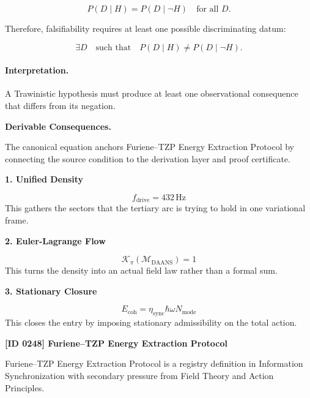 \begin{equation}
P(D\mid H)=P(D\mid \neg H)
\quad
\text{for all }D .
\end{equation}

Therefore, falsifiability requires at least one possible discriminating datum:

\begin{equation}
\boxed{
\exists D
\quad\text{such that}\quad
P(D\mid H)\neq P(D\mid \neg H).
}
\end{equation}

\paragraph{Interpretation.}
A Trawinistic hypothesis must produce at least one observational consequence that differs from its negation.

\par\vspace{0.35em}
\noindent\textbf{Derivable Consequences.}\quad
\begingroup
\footnotesize
\raggedright
The canonical equation anchors Furiene--TZP Energy Extraction Protocol by connecting the source condition to the derivation layer and proof certificate.
\par\endgroup

\noindent\textbf{1. Unified Density}\par
\[
f_{\mathrm{drive}}=432\,\mathrm{Hz}
\]
\noindent This gathers the sectors that the tertiary arc is trying to hold in one variational frame.\par
\noindent\textbf{2. Euler-Lagrange Flow}\par
\[
\mathcal{K}_{\pi}(\mathcal{M}_{\mathrm{DAANS}})=1
\]
\noindent This turns the density into an actual field law rather than a formal sum.\par
\noindent\textbf{3. Stationary Closure}\par
\[
E_{\mathrm{coh}}=\eta_{\mathrm{sync}}\hbar\omega N_{\mathrm{mode}}
\]
\noindent This closes the entry by imposing stationary admissibility on the total action.\par

\clearpage
\noindent\textbf{[ID 0248] Furiene--TZP Energy Extraction Protocol}\par
\vspace{0.35em}
\begingroup\small
{}
Furiene--TZP Energy Extraction Protocol is a registry definition in Information Synchronization with secondary pressure from Field Theory and Action Principles.

